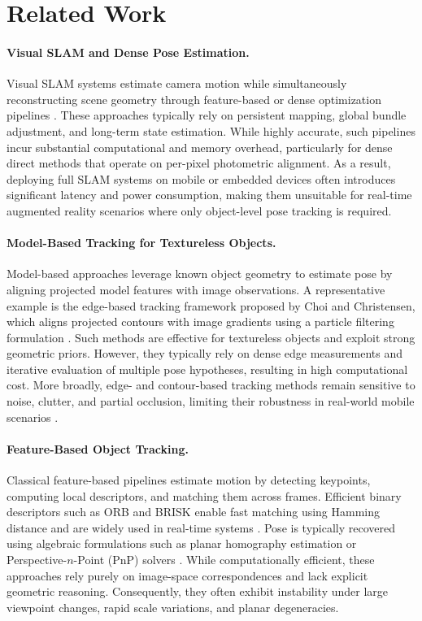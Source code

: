 \section{Related Work}

\paragraph{Visual SLAM and Dense Pose Estimation.}
Visual SLAM systems estimate camera motion while simultaneously reconstructing scene geometry through feature-based or dense optimization pipelines \cite{murartal2015orbslam, engel2014lsdslam, klein2007ptam, newcombe2011kinectfusion}. These approaches typically rely on persistent mapping, global bundle adjustment, and long-term state estimation. While highly accurate, such pipelines incur substantial computational and memory overhead, particularly for dense direct methods that operate on per-pixel photometric alignment. As a result, deploying full SLAM systems on mobile or embedded devices often introduces significant latency and power consumption, making them unsuitable for real-time augmented reality scenarios where only object-level pose tracking is required.

\paragraph{Model-Based Tracking for Textureless Objects.}
Model-based approaches leverage known object geometry to estimate pose by aligning projected model features with image observations. A representative example is the edge-based tracking framework proposed by Choi and Christensen, which aligns projected contours with image gradients using a particle filtering formulation \cite{choi2012textureless}. Such methods are effective for textureless objects and exploit strong geometric priors. However, they typically rely on dense edge measurements and iterative evaluation of multiple pose hypotheses, resulting in high computational cost. More broadly, edge- and contour-based tracking methods remain sensitive to noise, clutter, and partial occlusion, limiting their robustness in real-world mobile scenarios \cite{han2019review}.

\paragraph{Feature-Based Object Tracking.}
Classical feature-based pipelines estimate motion by detecting keypoints, computing local descriptors, and matching them across frames. Efficient binary descriptors such as ORB \cite{rublee2011orb} and BRISK \cite{leutenegger2011brisk} enable fast matching using Hamming distance and are widely used in real-time systems \cite{rosten2006fast, lowe2004sift}. Pose is typically recovered using algebraic formulations such as planar homography estimation or Perspective-$n$-Point (PnP) solvers \cite{kneip2011pnp, gao2003pnp, hartley2003multiple}. While computationally efficient, these approaches rely purely on image-space correspondences and lack explicit geometric reasoning. Consequently, they often exhibit instability under large viewpoint changes, rapid scale variations, and planar degeneracies.

